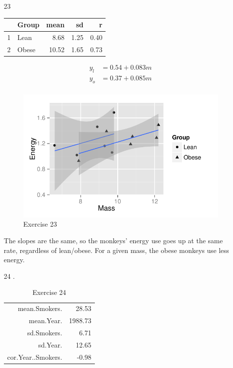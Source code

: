 \documentclass[landscape]{exam}
\begin{document}
\begin{enumerate}
    \item[23]
      \begin{table}[H]
        \centering
        \begin{tabular}{rlrrr}
          \toprule
                   & Group & mean  & sd   & r \\
          \midrule
          1        & Lean  & 8.68  & 1.25 & 0.40 \\
          2        & Obese & 10.52 & 1.65 & 0.73 \\
          \bottomrule
        \end{tabular}
      \end{table}

      \begin{align*}
        y_l & = 0.54 + 0.083 m \\
        y_o & = 0.37 + 0.085 m \\
      \end{align*}

      \begin{figure}[H]
        \centering
        \includegraphics[scale = 0.8]{figures/ex23.pdf}
        \caption{Exercise 23}
      \end{figure}

      The slopes are the same, so the monkeys' energy use goes up at the same
      rate, regardless of lean/obese.  For a given mass, the obese monkeys use
      less energy.

    \item[24].
      \begin{table}[H]
        \centering
        \begin{tabular}{rr}
          \toprule
          mean.Smokers.      & 28.53 \\
          mean.Year.         & 1988.73 \\
          sd.Smokers.        & 6.71 \\
          sd.Year.           & 12.65 \\
          cor.Year..Smokers. & -0.98 \\
          \bottomrule
        \end{tabular}
        \caption{Exercise 24}
      \end{table}


\end{enumerate}
\end{document}
